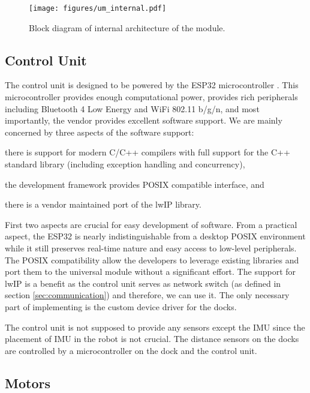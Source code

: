 \begin{figure}
    \centering
    \texttt{[image: figures/um\_internal.pdf]}
    \caption{Block diagram of internal architecture of the module.}
    \label{fig:um_internal}
\end{figure}

\subsection{Control Unit}

The control unit is designed to be powered by the ESP32 microcontroller
\cite{noauthor_esp32_2018}. This microcontroller provides enough computational
power, provides rich peripherals including Bluetooth 4 Low Energy and WiFi
802.11 b/g/n, and most importantly, the vendor provides excellent software
support. We are mainly concerned by three aspects of the software support:
\begin{enumerate*}
    \item there is support for modern C/C++ compilers with full support for the
    C++ standard library (including exception handling and concurrency),
    \item the development framework provides POSIX compatible interface, and
    \item there is a vendor maintained port of the lwIP library.
\end{enumerate*}

First two aspects are crucial for easy development of software. From a practical
aspect, the ESP32 is nearly indistinguishable from a desktop POSIX environment
while it still preserves real-time nature and easy access to low-level
peripherals. The POSIX compatibility allow the developers to leverage existing
libraries and port them to the universal module without a significant effort.
The support for lwIP is a benefit as the control unit serves as network
switch (as defined in section \ref{sec:communication}) and therefore, we can
use it. The only necessary part of implementing is the custom device driver for the
docks.

The control unit is not supposed to provide any sensors except the IMU since the
placement of IMU in the robot is not crucial. The distance sensors on the docks
are controlled by a microcontroller on the dock and the control unit.


\subsection{Motors}


